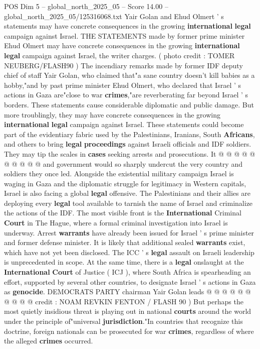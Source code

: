 \begin{textsample}{POS Dim 5 – global\_north\_2025\_05 – Score 14.00 – global\_north\_2025\_05/125316068.txt}  \label{ex:f5_pos_135}
Yair Golan and Ehud Olmert ' s statements may have concrete consequences in the growing \textbf{international} \textbf{legal} campaign against Israel.
THE STATEMENTS made by former prime minister Ehud Olmert may have concrete consequences in the growing \textbf{international} \textbf{legal} campaign against Israel, the writer charges. ( photo credit : TOMER NEUBERG/FLASH90 ) The incendiary remarks made by former IDF deputy chief of staff Yair Golan, who claimed that"a sane country doesn't kill babies as a hobby,"and by past prime minister Ehud Olmert, who declared that Israel ' s actions in Gaza are"close to war \textbf{crimes},"are reverberating far beyond Israel ' s borders.
These statements cause considerable diplomatic and public damage.
But more troublingly, they may have concrete consequences in the growing \textbf{international} \textbf{legal} campaign against Israel.
These statements could become part of the evidentiary fabric used by the Palestinians, Iranians, South \textbf{Africans}, and others to bring \textbf{legal} \textbf{proceedings} against Israeli officials and IDF soldiers.
They may tip the scales in \textbf{cases} seeking arrests and prosecutions.
It @ @ @ @ @ @ @ @ @ @ and government would so sharply undercut the very country and soldiers they once led.
Alongside the existential military campaign Israel is waging in Gaza and the diplomatic struggle for legitimacy in Western capitals, Israel is also facing a global \textbf{legal} offensive.
The Palestinians and their allies are deploying every \textbf{legal} tool available to tarnish the name of Israel and criminalize the actions of the IDF.
The most visible front is the \textbf{International} Criminal \textbf{Court} in The Hague, where a formal criminal investigation into Israel is underway.
Arrest \textbf{warrants} have already been issued for Israel ' s prime minister and former defense minister.
It is likely that additional sealed \textbf{warrants} exist, which have not yet been disclosed.
The ICC ' s \textbf{legal} assault on Israeli leadership is unprecedented in scope.
At the same time, there is a \textbf{legal} onslaught at the \textbf{International} \textbf{Court} of Justice ( ICJ ), where South Africa is spearheading an effort, supported by several other countries, to designate Israel ' s actions in Gaza as \textbf{genocide}.
DEMOCRATS PARTY chairman Yair Golan leads @ @ @ @ @ @ @ @ @ @ credit : NOAM REVKIN FENTON / FLASH 90 ) But perhaps the most quietly insidious threat is playing out in national \textbf{courts} around the world under the principle of"universal \textbf{jurisdiction}."In countries that recognize this doctrine, foreign nationals can be prosecuted for war \textbf{crimes}, regardless of where the alleged \textbf{crimes} occurred.

\end{textsample}
